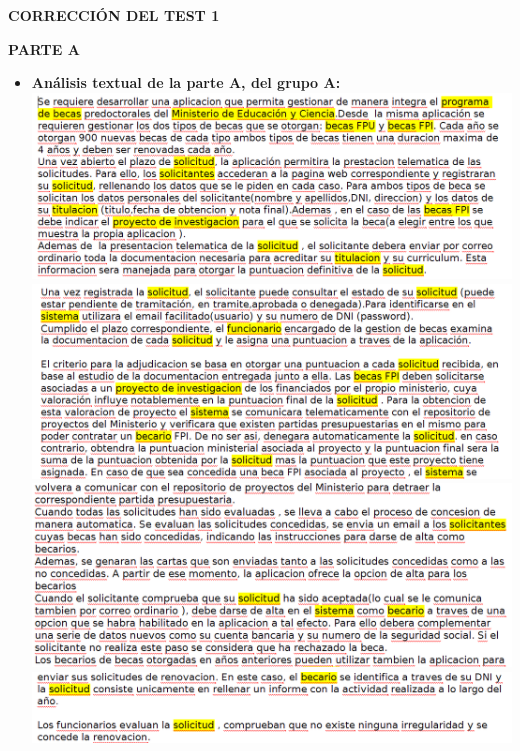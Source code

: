 \documentclass{article}
\begin{document}
{\begin{flushleft}
\begin{center}
\begin{Huge}
\textbf {CORRECCIÓN DEL TEST 1}\\
\end{Huge}
\end{center}
\begin{center}
\textbf {PARTE A}
\end{center}
\begin{itemize}
\item\textbf {Análisis textual de la parte A, del grupo A: }\\
\includegraphics[width=16cm]{img/PARTEA1} \hspace{0.5cm}
\includegraphics[width=16cm]{img/PARTEA2} \hspace{0.5cm}
\includegraphics[width=16cm]{img/PARTEA3} \hspace{0.5cm}
\includegraphics[width=16cm]{img/PARTEA4} \hspace{0.5cm}

\end{itemize}
\end{flushleft}}
\end{document}
